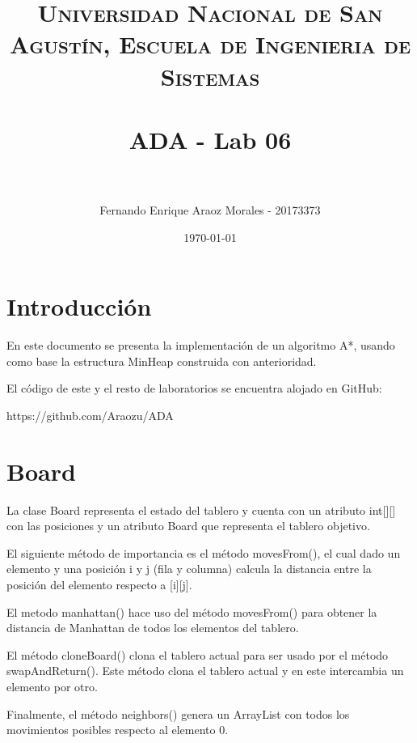 \documentclass[paper=a4, fontsize=11pt]{scrartcl} %
\title{	
\normalfont \normalsize 
\textsc{Universidad Nacional de San Agustín, Escuela de Ingenieria de Sistemas} \\ [25pt] %
\horrule{0.5pt} \\[0.4cm] %
\huge ADA - Lab 06 \\ %
\horrule{2pt} \\[0.5cm] %
}
\author{Fernando Enrique Araoz Morales - 20173373} %
\date{\normalsize\today} %
\numberwithin{equation}{section} %
\numberwithin{figure}{section} %
\numberwithin{table}{section} %
\begin{document}
\maketitle %


\section{Introducción}\label{sec:introducción}

En este documento se presenta la implementación de un algoritmo A*, usando como base la estructura
MinHeap construida con anterioridad.

El código de este y el resto de laboratorios se encuentra alojado en GitHub:

https://github.com/Araozu/ADA


    \section{Board}\label{sec:board}

    La clase Board representa el estado del tablero y cuenta con un atributo int[][] con las posiciones
    y un atributo Board que representa el tablero objetivo.

    El siguiente método de importancia es el método movesFrom(), el cual dado un elemento y una posición
    i y j (fila y columna) calcula la distancia entre la posición del elemento respecto a [i][j].

    El metodo manhattan() hace uso del método movesFrom() para obtener la distancia de Manhattan
    de todos los elementos del tablero.

    El método cloneBoard() clona el tablero actual para ser usado por el método swapAndReturn().
    Este método clona el tablero actual y en este intercambia un elemento por otro.

    Finalmente, el método neighbors() genera un ArrayList con todos los movimientos posibles respecto
    al elemento 0.
\end{document}
